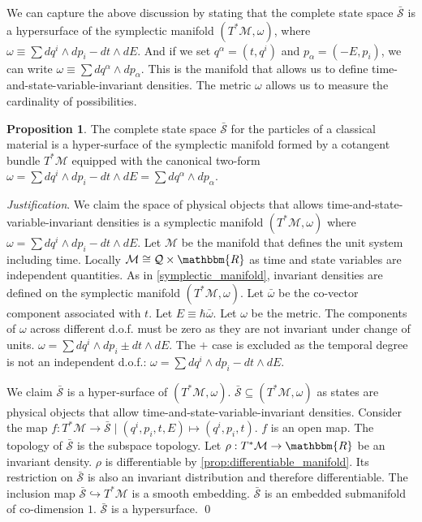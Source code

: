 \documentclass[aps,pra,10pt,twocolumn,floatfix,nofootinbib]{revtex4-1}
\numberwithin{equation}{section}
\theoremstyle{definition}
\newtheorem{prop}[equation]{Proposition}
\newenvironment{justification}{\emph{Justification}.}{\qed}
\begin{document}
We can capture the above discussion by stating that the complete state space $\bar{\mathcal{S}}$ is a hypersurface of the symplectic manifold $(T^*\mathcal{M}, \omega)$, where $\omega \equiv \sum dq^i \wedge dp_i - dt \wedge dE$. And if we set $q^\alpha = (t, q^i)$ and $p_\alpha = (-E, p_i)$, we can write $\omega \equiv \sum dq^\alpha \wedge dp_\alpha$. This is the manifold that allows us to define time-and-state-variable-invariant densities. The metric $\omega$ allows us to measure the cardinality of possibilities.

\begin{prop}\label{relativistic_symplectic_manifold}
	The complete state space $\bar{\mathcal{S}}$ for the particles of a classical material is a hyper-surface of the symplectic manifold formed by a cotangent bundle $T^*\mathcal{M}$ equipped with the canonical two-form $\omega = \sum dq^i \wedge dp_i - dt \wedge dE = \sum dq^\alpha \wedge dp_\alpha$.
\end{prop}

\begin{justification}
	We claim the space of physical objects that allows time-and-state-variable-invariant densities is a symplectic manifold $(T^*\mathcal{M}, \omega)$ where $\omega = \sum dq^i \wedge dp_i - dt \wedge dE$. Let $\mathcal{M}$ be the manifold that defines the unit system including time. Locally $\mathcal{M} \cong \mathcal{Q} \times \mathbbm{R}$ as time and state variables are independent quantities. As in \ref{symplectic_manifold}, invariant densities are defined on the symplectic manifold $(T^*\mathcal{M}, \omega)$. Let $\bar{\omega}$ be the co-vector component associated with $t$. Let $E\equiv\hbar \bar{\omega}$. Let $\omega$ be the metric. The components of $\omega$ across different d.o.f. must be zero as they are not invariant under change of units. $\omega=\sum dq^i \wedge dp_i \pm dt \wedge dE$. The $+$ case is excluded as the temporal degree is not an independent d.o.f.: $\omega = \sum dq^i \wedge dp_i - dt \wedge dE$.
	
	We claim $\bar{\mathcal{S}}$ is a hyper-surface of $(T^*\mathcal{M}, \omega)$. $\bar{\mathcal{S}} \subseteq (T^*\mathcal{M}, \omega)$ as states are physical objects that allow time-and-state-variable-invariant densities. Consider the map $f : T^*\mathcal{M} \rightarrow \bar{\mathcal{S}} \; | \; (q^i, p_i, t, E) \mapsto (q^i, p_i, t)$. $f$ is an open map. The topology of $\bar{\mathcal{S}}$ is the subspace topology. Let $\rho : T^*\mathcal{M} \rightarrow \mathbbm{R}$ be an invariant density. $\rho$ is differentiable by \ref{prop:differentiable_manifold}. Its restriction on $\bar{\mathcal{S}}$ is also an invariant distribution and therefore differentiable. The inclusion map $\bar{\mathcal{S}} \hookrightarrow T^*\mathcal{M}$ is a smooth embedding. $\bar{\mathcal{S}}$ is an embedded submanifold of co-dimension $1$. $\bar{\mathcal{S}}$ is a hypersurface.
\end{justification}
\end{document}
